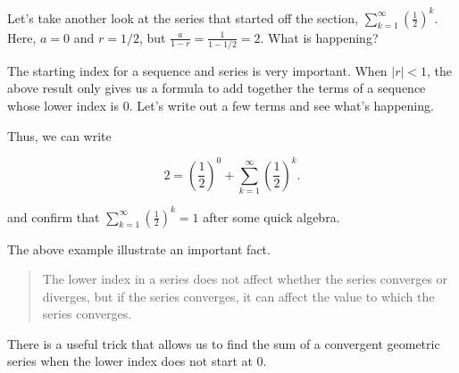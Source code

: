 \documentclass{ximera}
\begin{document}
\begin{example}
Let's take another look at the series that started off the section, $\sum_{k=1}^{\infty} \left(\frac{1}{2}\right)^k$.  Here, $a=0$ and $r=1/2$, but $\frac{a}{1-r} = \frac{1}{1-1/2} =2$.  What is happening?

The starting index for a sequence and series is very important.  When $|r|<1$, the above result only gives us a formula to add together the terms of a sequence whose lower index is $0$.  Let's write out a few terms and see what's happening.

\begin{image}
  \end{image}
  
Thus, we can write 

\[2 = \left(\frac{1}{2}\right)^0 +\sum_{k=1}^{\infty} \left(\frac{1}{2}\right)^k.\]

and confirm that $\sum_{k=1}^{\infty} \left(\frac{1}{2}\right)^k =1$ after some quick algebra.
\end{example}

The above example illustrate an important fact.

\begin{quote}
The lower index in a series does not affect whether the series converges or diverges, but if the series converges, it can affect the value to which the series converges.
\end{quote}

There is a useful trick that allows us to find the sum of a convergent geometric series when the lower index does not start at $0$.  
\end{document}
